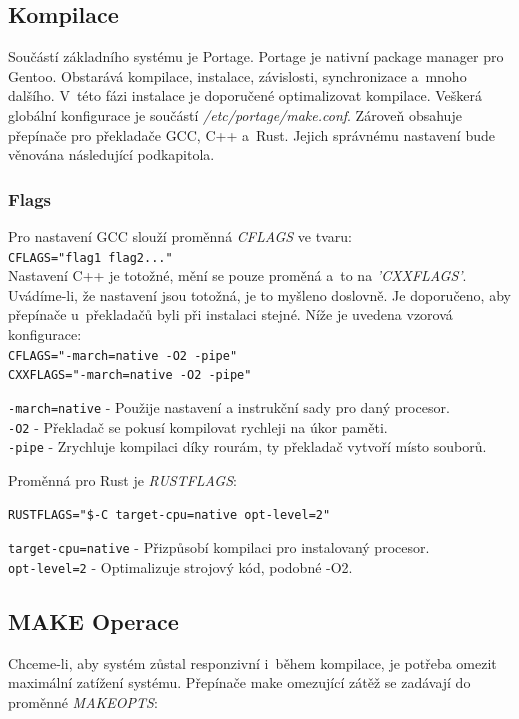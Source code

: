 \documentclass[12pt,a4paper,twoside,]{article}
\begin{document}
{{{{{{{\newpage
\subsection{\textsf{Kompilace}}
Součástí základního systému je Portage. Portage je nativní package manager pro Gentoo.
Obstarává kompilace, instalace, závislosti, synchronizace a~mnoho dalšího. V~této fázi instalace
je doporučené optimalizovat kompilace. Veškerá globální konfigurace je součástí \textit{/etc/portage/make.conf}.
Zároveň obsahuje přepínače pro překladače GCC, C++ a~Rust. Jejich správnému nastavení bude věnována následující podkapitola.

\subsubsection{\textsf{Flags}}
Pro nastavení GCC slouží proměnná \textit{CFLAGS} ve tvaru:\\ \hspace*{1.5em}\texttt{CFLAGS="flag1 flag2..."}\\Nastavení C++ je totožné, mění se pouze proměná a~to na \textit{'CXXFLAGS'}.
Uvádíme-li, že nastavení jsou totožná, je to myšleno doslovně. Je doporučeno, aby přepínače u~překladačů byli při instalaci stejné. Níže je uvedena
vzorová konfigurace:\\
\hspace*{1.5em}\texttt{CFLAGS="-march=native -O2 -pipe"}\\
\hspace*{1.5em}\texttt{CXXFLAGS="-march=native -O2 -pipe"}

\hspace{-1.5em}\texttt{-march=native} - Použije nastavení a instrukční sady pro daný procesor.\\
\texttt{-O2} - Překladač se pokusí kompilovat rychleji na úkor paměti.\\
\texttt{-pipe} - Zrychluje kompilaci díky rourám, ty překladač vytvoří místo souborů.

\hspace{-1.5em}Proměnná pro Rust je \textit{RUSTFLAGS}:

\texttt{RUSTFLAGS="\$-C target-cpu=native opt-level=2"}

\hspace{-1.5em}\texttt{target-cpu=native} - Přizpůsobí kompilaci pro instalovaný procesor.\\
\texttt{opt-level=2} - Optimalizuje strojový kód, podobné -O2. %
\subsection{\textsf{MAKE Operace}}
Chceme-li, aby systém zůstal responzivní i~během kompilace, je potřeba omezit maximální zatížení systému.
Přepínače make omezující zátěž se zadávají do proměnné \textit{MAKEOPTS}:

}}}}}}}
\end{document}
